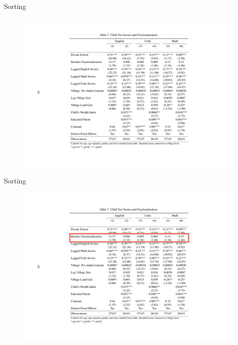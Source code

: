 \documentclass{beamer}
\begin{document}
\begin{frame}{Sorting}
	\begin{figure}[htb]
		\begin{center}
		\includegraphics[scale=0.65]{tables/mean_preserving.pdf}
		\end{center}
	\end{figure}
\end{frame}

\begin{frame}{Sorting}
	\begin{figure}[htb]
		\begin{center}
		\includegraphics[scale=0.65]{tables/mean_preserving_box1.pdf}
		\end{center}
	\end{figure}
\end{frame}
\end{document}

